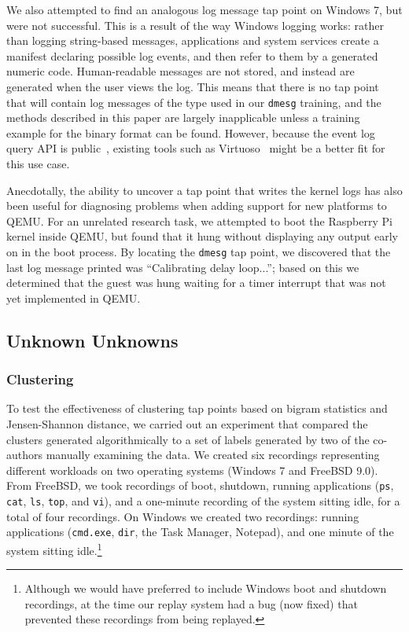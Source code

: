 We also attempted to find an analogous log message tap point on Windows
7, but were not successful. This is a result of the way Windows logging
works: rather than logging string-based messages, applications and
system services create a manifest declaring possible log events, and
then refer to them by a generated numeric code. Human-readable messages
are not stored, and instead are generated when the user views the log.
This means that there is no tap point that will contain log messages of
the type used in our \texttt{dmesg} training, and the methods described
in this paper are largely inapplicable unless a training example for the
binary format can be found. However, because the event log query API
is public~\cite{evtquery}, existing tools such as
Virtuoso~\cite{Dolan-Gavitt:2011uq} might be a better fit for this use
case.

Anecdotally, the ability to uncover a tap point that writes the kernel
logs has also been useful for diagnosing problems when adding support
for new platforms to QEMU. For an unrelated research task, we attempted
to boot the Raspberry Pi~\cite{raspberrypi} kernel inside QEMU, but
found that it hung without displaying any output early on in the boot
process. By locating the \texttt{dmesg} tap point, we discovered that
the last log message printed was ``Calibrating delay loop...''; based on
this we determined that the guest was hung waiting for a timer interrupt
that was not yet implemented in QEMU.

\subsection{Unknown Unknowns}
\subsubsection{Clustering}
\label{sec:eval:subsec:cluster}

To test the effectiveness of clustering tap points based on bigram
statistics and Jensen-Shannon distance, we carried out an experiment
that compared the clusters generated algorithmically to a set of labels
generated by two of the co-authors manually examining the data. We
created six recordings representing different workloads on two operating
systems (Windows 7 and FreeBSD 9.0). From FreeBSD, we took recordings of
boot, shutdown, running applications (\texttt{ps}, \texttt{cat},
\texttt{ls}, \texttt{top}, and \texttt{vi}), and a one-minute recording
of the system sitting idle, for a total of four recordings. On Windows
we created two recordings: running applications (\texttt{cmd.exe},
\texttt{dir}, the Task Manager, Notepad), and one minute of the system
sitting idle.\footnote{Although we would have preferred to include
Windows boot and shutdown recordings, at the time our replay system had
a bug (now fixed) that prevented these recordings from being replayed.}

